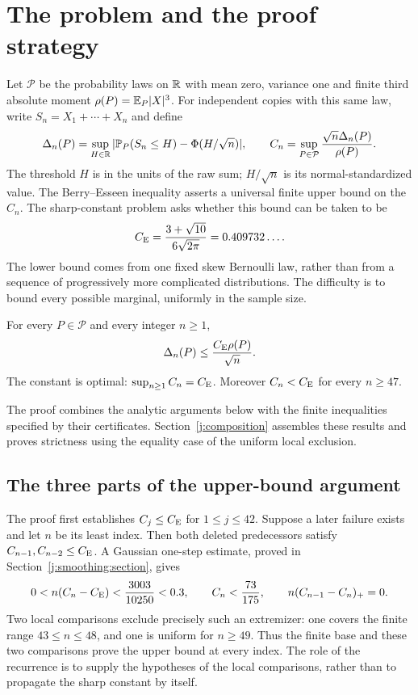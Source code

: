 \section{The problem and the proof strategy}
\label{j:introduction}

Let $\mathcal P$ be the probability laws on $\mathbb R$ with mean zero,
variance one and finite third absolute moment $\rho(P)=\mathbb E_P|X|^3$.
For independent copies with this same law, write $S_n=X_1+\cdots+X_n$
and define
\[
 \Delta_n(P)=\sup_{H\in\mathbb R}|\mathbb P_P(S_n\le H)-\Phi(H/\sqrt n)|,
 \qquad C_n=\sup_{P\in\mathcal P}\frac{\sqrt n\Delta_n(P)}{\rho(P)}.
\]
The threshold $H$ is in the units of the raw sum; $H/\sqrt n$ is its
normal-standardized value. The Berry--Esseen inequality
\cite{Berry1941,Esseen1942,Esseen1945} asserts a universal finite upper
bound on the $C_n$. The sharp-constant problem asks whether this bound
can be taken to be
\[
 C_{\mathrm E}=\frac{3+\sqrt{10}}{6\sqrt{2\pi}}=0.409732\ldots.
\]
The lower bound comes from one fixed skew Bernoulli law, rather than
from a sequence of progressively more complicated distributions.
The difficulty is to bound every possible marginal, uniformly in the
sample size.

\begin{theorem}\label{j:main}
For every $P\in\mathcal P$ and every integer $n\ge1$,
\[
 \Delta_n(P)\le\frac{C_{\mathrm E}\rho(P)}{\sqrt n}.
\]
The constant is optimal: $\sup_{n\ge1}C_n=C_{\mathrm E}$.
Moreover $C_n<C_{\mathrm E}$ for every $n\ge47$.
\end{theorem}
The proof combines the analytic arguments below with the finite
inequalities specified by their certificates. Section~\ref{j:composition}
assembles these results and proves strictness using the equality case
of the uniform local exclusion.

\subsection{The three parts of the upper-bound argument}

The proof first establishes $C_j\le C_{\mathrm E}$ for $1\le j\le42$.
Suppose a later failure exists and let $n$ be its least index. Then both
deleted predecessors satisfy $C_{n-1},C_{n-2}\le C_{\mathrm E}$. A Gaussian
one-step estimate, proved in Section~\ref{j:smoothing:section}, gives
\[
 0<n(C_n-C_{\mathrm E})<\frac{3003}{10250}<0.3,\qquad
 C_n<\frac{73}{175},\qquad n(C_{n-1}-C_n)_+=0.
\]
Two local comparisons exclude precisely such an extremizer: one covers
the finite range $43\le n\le48$, and one is uniform for $n\ge49$.
Thus the finite base and these two comparisons prove the upper bound
at every index. The role of the recurrence is to supply the hypotheses
of the local comparisons, rather than to propagate the sharp constant
by itself.

